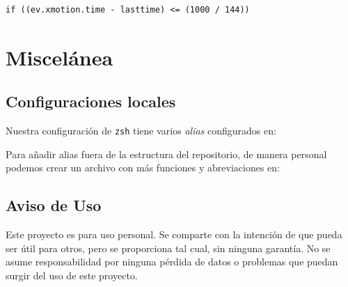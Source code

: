 \documentclass[11pt]{article}
\begin{document}
\begin{verbatim}
if ((ev.xmotion.time - lasttime) <= (1000 / 144))
\end{verbatim}

\section{Miscelánea}

\subsection*{Configuraciones locales}

Nuestra configuración de \texttt{zsh} tiene varios \emph{alias} configurados en:

\begin{center}
\end{center}

Para añadir alias fuera de la estructura del repositorio, de manera personal podemos crear un archivo con más funciones y abreviaciones en:

\begin{center}
\end{center}

\subsection*{Aviso de Uso}

Este proyecto es para uso personal. Se comparte con la intención de que pueda ser útil para otros, pero se proporciona tal cual, sin ninguna garantía. No se asume responsabilidad por ninguna pérdida de datos o problemas que puedan surgir del uso de este proyecto.
\end{document}
